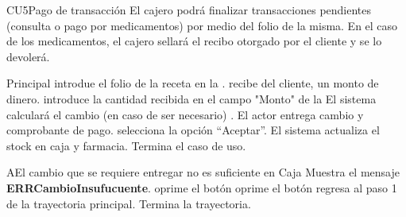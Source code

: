 
% 



	\begin{UseCase}{CU5}{Pago de transacci\'on}{
		El cajero podr\'a finalizar transacciones pendientes (consulta o pago por medicamentos) por medio del folio de la misma.
En el caso de los medicamentos, el cajero sellar\'a el recibo otorgado por el cliente y se lo devoler\'a.
	}
	\end{UseCase}

	\begin{UCtrayectoria}{Principal}
		\UCpaso[\UCactor] introdue el folio de la receta en la .
		\UCpaso[\UCactor] recibe del cliente, un monto de dinero.
		\UCpaso[\UCactor]introduce la cantidad recibida en el campo "Monto" de la 
		\UCpaso El sistema calcular\'a el cambio (en caso de ser necesario) 
		\label{IUConsulta} .
		\UCpaso[\UCactor] El actor entrega cambio y comprobante de pago.
		\UCpaso [\UCactor] selecciona la opción "`Aceptar"'.  
		\UCpaso El sistema actualiza el stock en caja y farmacia. 
		\UCpaso[] Termina el caso de uso.
	\end{UCtrayectoria}
		
		\begin{UCtrayectoriaA}{A}{El cambio que se requiere entregar no es suficiente en Caja}
			\UCpaso Muestra el mensaje {\bf ERRCambioInsufucuente}.
			\UCpaso[\UCactor] oprime el botón 
			\UCpaso[\UCactor] oprime el botón 
			\UCPaso[\UCactor] regresa al paso 1 de la trayectoria principal.  
			\UCpaso[] Termina la trayectoria.
		\end{UCtrayectoriaA}
		
		
